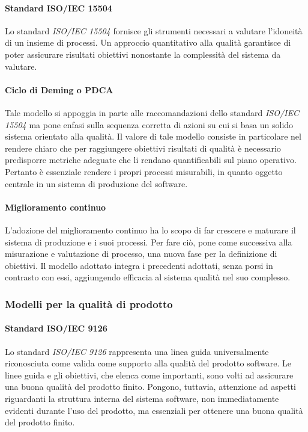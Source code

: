 \documentclass[12pt,a4paper]{article}
\begin{document}
\paragraph{Standard ISO/IEC 15504}
Lo standard \textit{ISO/IEC 15504} fornisce gli strumenti necessari a valutare l'idoneità di un insieme di processi. Un approccio quantitativo alla qualità garantisce di poter assicurare risultati obiettivi nonostante la complessità del sistema da valutare.

\paragraph{Ciclo di Deming o PDCA}
Tale modello si appoggia in parte alle raccomandazioni dello standard \textit{ISO/IEC 15504} ma pone enfasi sulla sequenza corretta di azioni su cui si basa un solido sistema orientato alla qualità. Il valore di tale modello consiste in particolare nel rendere chiaro che per raggiungere obiettivi risultati di qualità è necessario predisporre metriche adeguate che li rendano quantificabili sul piano operativo. Pertanto è essenziale rendere i propri processi misurabili, in quanto oggetto centrale in un sistema di produzione del software.

\paragraph{Miglioramento continuo}
L'adozione del miglioramento continuo ha lo scopo di far crescere e maturare il sistema di produzione e i suoi processi. Per fare ciò, pone come successiva alla misurazione e valutazione di processo, una nuova fase per la definizione di obiettivi. Il modello adottato integra i precedenti adottati, senza porsi in contrasto con essi, aggiungendo efficacia al sistema qualità nel suo complesso.

\subsubsection{Modelli per la qualità di prodotto}

\paragraph{Standard ISO/IEC 9126}
Lo standard \textit{ISO/IEC 9126} rappresenta una linea guida universalmente riconosciuta come valida come supporto alla qualità del prodotto software. Le linee guida e gli obiettivi, che elenca come importanti, sono volti ad assicurare una buona qualità del prodotto finito. Pongono, tuttavia, attenzione ad aspetti riguardanti la struttura interna del sistema software, non immediatamente evidenti durante l'uso del prodotto, ma essenziali per ottenere una buona qualità del prodotto finito.
\end{document}
